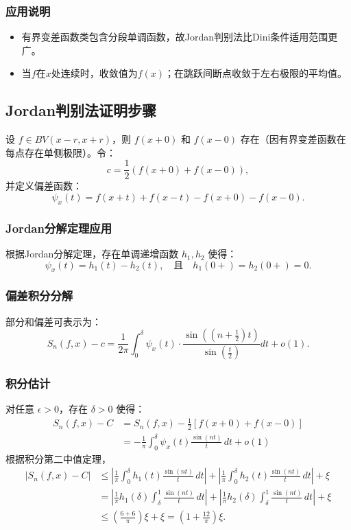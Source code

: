 \documentclass[12pt]{article}
\begin{document}
\subsubsection{应用说明}
\begin{itemize}
	\item 有界变差函数类包含分段单调函数，故Jordan判别法比Dini条件适用范围更广。
	\item 当$f$在$x$处连续时，收敛值为$f(x)$；在跳跃间断点收敛于左右极限的平均值。
\end{itemize}
	
	\subsection{Jordan判别法证明步骤}
	设 \( f \in BV(x-r, x+r) \)，则 \( f(x+0) \) 和 \( f(x-0) \) 存在（因有界变差函数在每点存在单侧极限）。令：
	\[
	c = \frac{1}{2} \left( f(x+0) + f(x-0) \right),
	\]
	并定义偏差函数：
	\[
	\psi_x(t) = f(x+t) + f(x-t) - f(x+0) - f(x-0).
	\]
	
	\subsubsection{Jordan分解定理应用}
	根据Jordan分解定理，存在单调递增函数 \( h_1, h_2 \) 使得：
	\[
	\psi_x(t) = h_1(t) - h_2(t), \quad \text{且} \quad h_1(0+) = h_2(0+) = 0.
	\]
	
	\subsubsection{偏差积分分解}
	部分和偏差可表示为：
	\[
	S_n(f, x) - c = \frac{1}{2\pi} \int_0^\delta \psi_x(t) \cdot \frac{\sin\left( (n+\frac{1}{2})t \right)}{\sin\left( \frac{t}{2} \right)} dt + o(1).
	\]
	
	\subsubsection{积分估计}
	对任意 \( \epsilon > 0 \)，存在 \( \delta > 0 \) 使得：
\[
\begin{aligned}
	S_n(f, x) - C 
	&= S_n(f, x) - \frac{1}{2} \left[ f(x+0) + f(x-0) \right] \\
	&= -\frac{1}{\pi} \int_0^\delta \psi_x(t) \frac{\sin(nt)}{t} \, dt + o(1)
\end{aligned}
\]
根据积分第二中值定理，
\[
\begin{aligned}
	\left| S_n(f, x) - C \right| 
	&\leq \left| \frac{1}{\pi} \int_0^\delta h_1(t) \frac{\sin(nt)}{t} \, dt \right| 
	+ \left| \frac{1}{\pi} \int_0^\delta h_2(t) \frac{\sin(nt)}{t} \, dt \right| 
	+ \xi \\
	&= \left| \frac{1}{\pi} h_1(\delta) \int_{\delta}^{1} \frac{\sin(nt)}{t} \, dt \right| 
	+ \left| \frac{1}{\pi} h_2(\delta) \int_{\delta}^{1} \frac{\sin(nt)}{t} \, dt \right| 
	+ \xi \\
	&\leq \left( \frac{6+6}{\pi} \right) \xi + \xi 
	= \left( 1 + \frac{12}{\pi} \right) \xi.
\end{aligned}
\]
\end{document}
